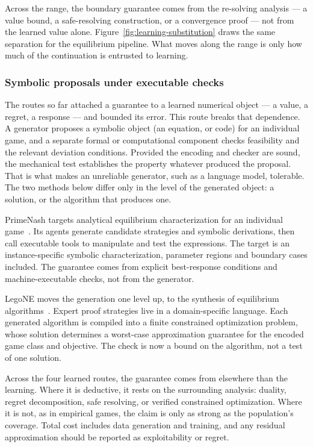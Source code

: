 Across the range, the boundary guarantee comes from the re-solving analysis --- a
value bound, a safe-resolving construction, or a convergence proof --- not from the
learned value alone. Figure~\ref{fig:learning-substitution} draws the same
separation for the equilibrium pipeline. What moves along the range is only how much
of the continuation is entrusted to learning.

\subsubsection{Symbolic proposals under executable checks}
The routes so far attached a guarantee to a learned numerical object --- a value, a
regret, a response --- and bounded its error. This route breaks that dependence. A generator proposes a symbolic object (an equation, or code) for an
individual game, and a separate formal or computational component checks feasibility and the
relevant deviation conditions. Provided the encoding and checker are sound, the
mechanical test establishes the property whatever produced the proposal. That is
what makes an unreliable generator, such as a language model, tolerable. The two
methods below differ only in the level of the generated object: a solution, or the
algorithm that produces one.

 PrimeNash targets analytical equilibrium
characterization for an individual game~\citep{PrimeNash2025}. Its agents generate
candidate strategies and symbolic derivations, then call executable tools to
manipulate and test the expressions. The target is an instance-specific symbolic
characterization, parameter regions and boundary cases included. The guarantee
comes from explicit best-response conditions and machine-executable checks, not
from the generator.

 LegoNE moves the generation one level up, to the
synthesis of equilibrium algorithms~\citep{LegoNE2025}. Expert proof strategies
live in a domain-specific language. Each generated algorithm is compiled into a
finite constrained optimization problem, whose solution determines a worst-case
approximation guarantee for the encoded game class and objective. The check is now
a bound on the algorithm, not a test of one solution.

Across the four learned routes, the guarantee comes from elsewhere than the
learning. Where it is deductive, it rests on the
surrounding analysis: duality, regret decomposition, safe resolving, or verified
constrained optimization. Where it is not, as in empirical games, the claim is only
as strong as the population's coverage. Total cost includes data generation and
training, and any residual approximation should be reported as exploitability or
regret.

